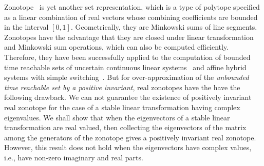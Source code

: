 Zonotope~\cite{DBLP:conf/hybrid/Girard05} is yet another set
representation, which is a type of polytope specified as a linear
combination of real vectors whose combining coefficients are bounded
in the interval $[0,1]$.  Geometrically, they are Minkowski sums of
line segments.  Zonotopes have the advantage that they are closed
under linear transformation and Minkowski sum operations, which can
also be computed efficiently.  Therefore, they have been successfully
applied to the computation of bounded time reachable sets of uncertain
continuous linear systems~\cite{DBLP:conf/hybrid/Girard05} and affine
hybrid systems with simple
switching~\cite{makhlouf2014networked,girard2008zonotope}.  But
for over-approximation of the {\it unbounded time reachable set by a
positive invariant}, real zonotopes have the have the following
drawback.  We can not guarantee the existence of positively invariant
real zonotope for the case of a stable linear transformation having
complex eigenvalues.  We shall show that when the eigenvectors of a
stable linear transformation are real valued, then collecting the
eigenvectors of the matrix among the generators of the zonotope gives
a positively invariant real zonotope.  However, this result does not
hold when the eigenvectors have complex values, i.e., have non-zero
imaginary and real parts.

\begin{table}
\caption{Comparison of set representations}~\label{tab:compset}
\end{table}


